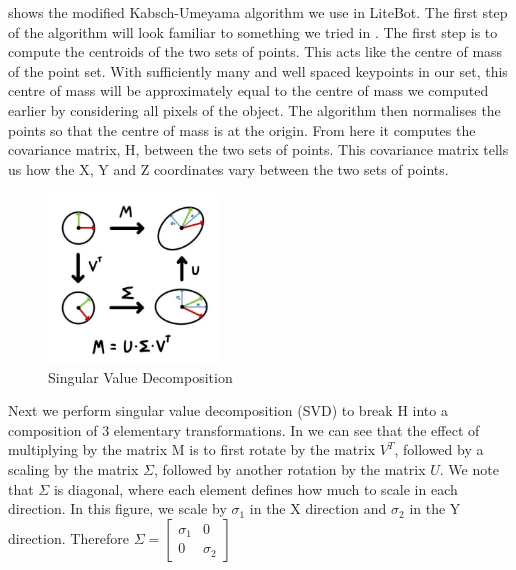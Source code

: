 
 shows the modified Kabsch-Umeyama algorithm we use in LiteBot. The first step of the algorithm will look familiar to something we tried in . The first step is to compute the centroids of the two sets of points. This acts like the centre of mass of the point set. With sufficiently many and well spaced keypoints in our set, this centre of mass will be approximately equal to the centre of mass we computed earlier by considering all pixels of the object. The algorithm then normalises the points so that the centre of mass is at the origin. From here it computes the covariance matrix, H, between the two sets of points. This covariance matrix tells us how the X, Y and Z coordinates vary between the two sets of points.\\


\begin{figure}
    \centering
    \includegraphics[width=0.4\textwidth]{figures/SVD.jpg}
    \caption{Singular Value Decomposition}
    \label{fig:svd}
\end{figure}

Next we perform singular value decomposition (SVD) to break H into a composition of 3 elementary transformations. In  we can see that the effect of multiplying by the matrix M is to first rotate by the matrix $V^T$, followed by a scaling by the matrix $\Sigma$, followed by another rotation by the matrix $U$. We note that $\Sigma$ is diagonal, where each element defines how much to scale in each direction. In this figure, we scale by $\sigma_1$ in the X direction and $\sigma_2$ in the Y direction. Therefore
$\Sigma = \begin{bmatrix}
  \sigma_1 & 0\\
  0 & \sigma_2
\end{bmatrix} $\\

